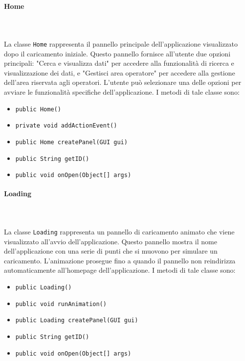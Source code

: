 \paragraph{Home}\\
\\
La classe \texttt{Home} rappresenta il pannello principale dell'applicazione visualizzato dopo il caricamento iniziale.
Questo pannello fornisce all'utente due opzioni principali: "Cerca e visualizza dati" per accedere alla funzionalità di ricerca e visualizzazione dei dati, e "Gestisci area operatore" per accedere alla gestione dell'area riservata agli operatori.
L'utente può selezionare una delle opzioni per avviare le funzionalità specifiche dell'applicazione.
I metodi di tale classe sono:
\begin{itemize}
    \item \texttt{public Home()}
    \item \texttt{private void addActionEvent()}
    \item \texttt{public Home createPanel(GUI gui)}
    \item \texttt{public String getID()}
    \item \texttt{public void onOpen(Object[] args)}
\end{itemize}

\paragraph{Loading}\\
\\
La classe \texttt{Loading} rappresenta un pannello di caricamento animato che viene visualizzato all'avvio dell'applicazione.
Questo pannello mostra il nome dell'applicazione con una serie di punti che si muovono per simulare un caricamento. 
L'animazione prosegue fino a quando il pannello non reindirizza automaticamente all'homepage dell'applicazione.
I metodi di tale classe sono:
\begin{itemize}
    \item \texttt{public Loading()}
    \item \texttt{public void runAnimation()}
    \item \texttt{public Loading createPanel(GUI gui)}
    \item \texttt{public String getID()}
    \item \texttt{public void onOpen(Object[] args)}
\end{itemize}

